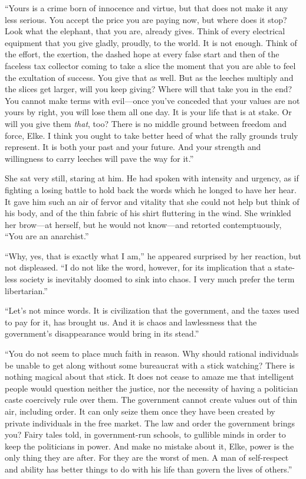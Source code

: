 ``Yours is a crime born of innocence and virtue, but that does not make it any less serious. You accept the price you are paying now, but where does it stop? Look what the elephant, that you are, already gives. Think of every electrical equipment that you give gladly, proudly, to the world. It is not enough. Think of the effort, the exertion, the dashed hope at every false start and then of the faceless tax collector coming to take a slice the moment that you are able to feel the exultation of success. You give that as well. But as the leeches multiply and the slices get larger, will you keep giving? Where will that take you in the end? You cannot make terms with evil---once you've conceded that your values are not yours by right, you will lose them all one day. It is your life that is at stake. Or will you give them \emph{that}, too? There is no middle ground between freedom and force, Elke. I think you ought to take better heed of what the rally grounds truly represent. It is both your past and your future. And your strength and willingness to carry leeches will pave the way for it.''

She sat very still, staring at him. He had spoken with intensity and urgency, as if fighting a losing battle to hold back the words which he longed to have her hear. It gave him such an air of fervor and vitality that she could not help but think of his body, and of the thin fabric of his shirt fluttering in the wind. She wrinkled her brow---at herself, but he would not know---and retorted contemptuously, ``You are an anarchist.''

``Why, yes, that is exactly what I am,'' he appeared surprised by her reaction, but not displeased. ``I do not like the word, however, for its implication that a state-less society is inevitably doomed to sink into chaos. I very much prefer the term libertarian.''

``Let's not mince words. It is civilization that the government, and the taxes used to pay for it, has brought us. And it is chaos and lawlessness that the government's disappearance would bring in its stead.''

``You do not seem to place much faith in reason. Why should rational individuals be unable to get along without some bureaucrat with a stick watching? There is nothing magical about that stick. It does not cease to amaze me that intelligent people would question neither the justice, nor the necessity of having a politician caste coercively rule over them. The government cannot create values out of thin air, including order. It can only seize them once they have been created by private individuals in the free market. The law and order the government brings you? Fairy tales told, in government-run schools, to gullible minds in order to keep the politicians in power. And make no mistake about it, Elke, power is the only thing they are after. For they are the worst of men. A man of self-respect and ability has better things to do with his life than govern the lives of others.''


